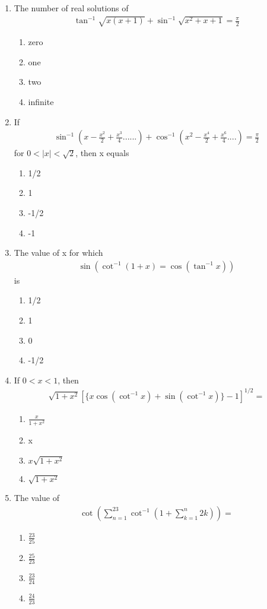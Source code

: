 \begin{enumerate}[label=\arabic*.,ref=\thesubsection.\theenumi]
\item The number of real solutions of 
\begin{align*}
\tan^{-1} \sqrt{x(x + 1)} + \sin^{-1} \sqrt{x^2 + x + 1} = \frac{\pi}{2}
\end{align*}
\begin{enumerate}
\item zero
\item one
\item two
\item infinite
\end{enumerate}

\item If 
\begin{align*}
\sin^{-1}(x - \frac{x^{2}}{2} + \frac{x^{3}}{4}......) + \cos^{-1}(x^{2} - \frac{x^{4}}{2} + \frac{x^{6}}{4}....) = \frac{\pi}{2} 
\end{align*}
for $0 < |x| < \sqrt{2}$, then x equals
\begin{enumerate}
\item 1/2
\item 1
\item -1/2
\item -1
\end{enumerate}

\item The value of x for which 
\begin{align*}
\sin(\cot^{-1}(1 + x) = \cos(\tan^{-1}x))
\end{align*}
is
\begin{enumerate}
\item 1/2
\item 1
\item 0
\item -1/2
\end{enumerate}

\item If $0 < x < 1$, then 
\begin{align*}
\sqrt{1 + x^2}[\{x\cos(\cot^{-1}x) + \sin(\cot^{-1}x)\} - 1]^{1/2} =
\end{align*}
\begin{enumerate}
\item $\frac{x}{1 + x^2}$
\item x
\item $x\sqrt{1 + x^2}$
\item $\sqrt{1 + x^2}$
\end{enumerate}

\item The value of 
\begin{align*}
\cot(\sum_{n=1}^{23} \cot^{-1}(1 + \sum_{k = 1}^{n}2k))=
\end{align*}
\begin{enumerate}
\item $\frac{23}{25}$
\item $\frac{25}{23}$
\item $\frac{23}{24}$
\item $\frac{24}{23}$
\end{enumerate}


\end{enumerate}
